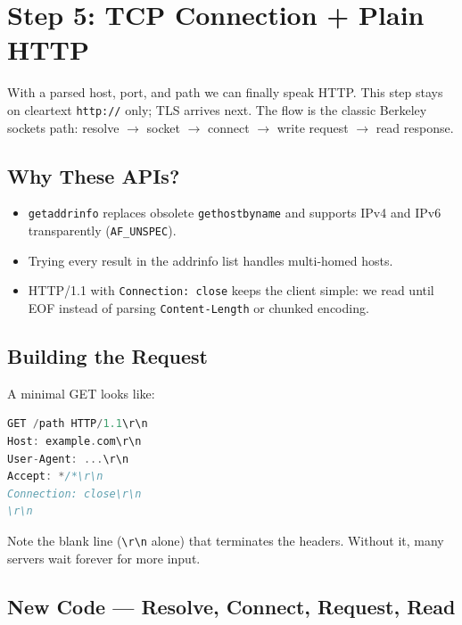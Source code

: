 \section{Step 5: TCP Connection + Plain HTTP}

With a parsed host, port, and path we can finally speak HTTP. This step stays
on cleartext \texttt{http://} only; TLS arrives next. The flow is the classic
Berkeley sockets path: resolve $\rightarrow$ socket $\rightarrow$ connect
$\rightarrow$ write request $\rightarrow$ read response.

\subsection{Why These APIs?}

\begin{itemize}[leftmargin=1.4em]
    \item \texttt{getaddrinfo} replaces obsolete \texttt{gethostbyname} and
          supports IPv4 and IPv6 transparently (\texttt{AF\_UNSPEC}).
    \item Trying every result in the addrinfo list handles multi-homed hosts.
    \item HTTP/1.1 with \texttt{Connection: close} keeps the client simple:
          we read until EOF instead of parsing \texttt{Content-Length} or
          chunked encoding.
\end{itemize}

\subsection{Building the Request}

A minimal GET looks like:

\begin{lstlisting}[style=snippet,language=C]
GET /path HTTP/1.1\r\n
Host: example.com\r\n
User-Agent: ...\r\n
Accept: */*\r\n
Connection: close\r\n
\r\n
\end{lstlisting}

Note the blank line (\texttt{\textbackslash r\textbackslash n} alone) that
terminates the headers. Without it, many servers wait forever for more input.

\subsection{New Code --- Resolve, Connect, Request, Read}

